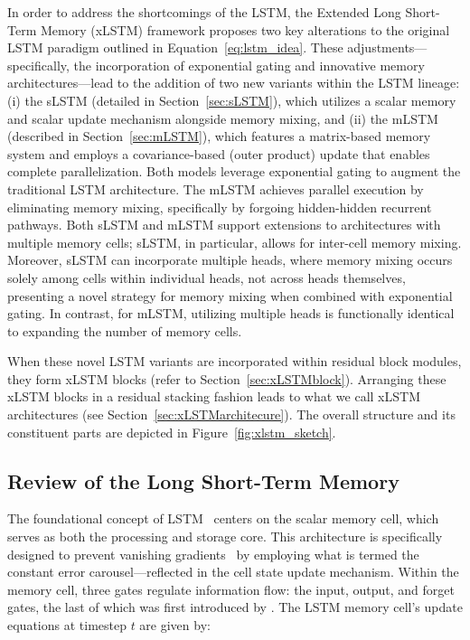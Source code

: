 In order to address the shortcomings of the LSTM, the Extended Long Short-Term Memory (xLSTM) framework proposes two key alterations to the original LSTM paradigm outlined in Equation~\eqref{eq:lstm_idea}. These adjustments—specifically, the incorporation of exponential gating and innovative memory architectures—lead to the addition of two new variants within the LSTM lineage: (i) the sLSTM (detailed in Section~\ref{sec:sLSTM}), which utilizes a scalar memory and scalar update mechanism alongside memory mixing, and (ii) the mLSTM (described in Section~\ref{sec:mLSTM}), which features a matrix-based memory system and employs a covariance-based (outer product) update that enables complete parallelization. Both models leverage exponential gating to augment the traditional LSTM architecture. The mLSTM achieves parallel execution by eliminating memory mixing, specifically by forgoing hidden-hidden recurrent pathways. Both sLSTM and mLSTM support extensions to architectures with multiple memory cells; sLSTM, in particular, allows for inter-cell memory mixing. Moreover, sLSTM can incorporate multiple heads, where memory mixing occurs solely among cells within individual heads, not across heads themselves, presenting a novel strategy for memory mixing when combined with exponential gating. In contrast, for mLSTM, utilizing multiple heads is functionally identical to expanding the number of memory cells.

When these novel LSTM variants are incorporated within residual block modules, they form xLSTM blocks (refer to Section~\ref{sec:xLSTMblock}). Arranging these xLSTM blocks in a residual stacking fashion leads to what we call xLSTM architectures (see Section~\ref{sec:xLSTMarchitecure}). The overall structure and its constituent parts are depicted in Figure~\ref{fig:xlstm_sketch}.

\subsection{Review of the Long Short-Term Memory}
\label{sec:orgLSTM}

The foundational concept of LSTM~\citep{Hochreiter:91,Hochreiter:97nips,Hochreiter:97} centers on the scalar memory cell, which serves as both the processing and storage core. This architecture is specifically designed to prevent vanishing gradients~\citep{Hochreiter:91,Hochreiter:00book} by employing what is termed the constant error carousel—reflected in the cell state update mechanism. Within the memory cell, three gates regulate information flow: the input, output, and forget gates, the last of which was first introduced by \citet{Gers:00}. The LSTM memory cell’s update equations at timestep $t$ are given by:

